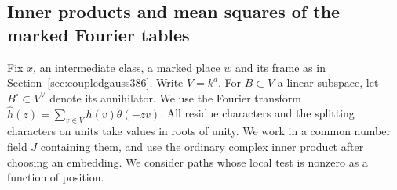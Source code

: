 \documentclass[a4paper,11pt]{article}
\theoremstyle{definition}
\theoremstyle{remark}
\numberwithin{equation}{section}
\begin{document}
\subsection{Inner products and mean squares of the marked Fourier tables}
\label{sec:markedtablegram387}

Fix \(x\), an intermediate class, a marked place \(w\) and its frame
as in Section~\ref{sec:coupledgauss386}. Write \(V=k^d\). For
\(B\subset V\) a linear subspace, let \(B^\circ\subset V^\vee\)
denote its annihilator. We use the Fourier transform
\(\widehat h(z)=\sum_{v\in V}h(v)\theta(-zv)\).
All residue characters and the splitting characters on units take
values in roots of unity. We work in a common number field \(J\)
containing them, and use the ordinary complex inner product after
choosing an embedding. We consider paths whose local test is
nonzero as a function of position.
\end{document}
